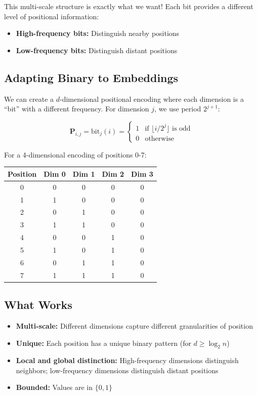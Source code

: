 \documentclass{article}
\begin{document}
This multi-scale structure is exactly what we want! Each bit provides a different level of positional information:
\begin{itemize}
\item \textbf{High-frequency bits:} Distinguish nearby positions
\item \textbf{Low-frequency bits:} Distinguish distant positions
\end{itemize}

\subsection{Adapting Binary to Embeddings}

We can create a $d$-dimensional positional encoding where each dimension is a ``bit'' with a different frequency. For dimension $j$, we use period $2^{j+1}$:

\[
\mathbf{P}_{i,j} = \text{bit}_j(i) = \begin{cases}
1 & \text{if } \lfloor i / 2^j \rfloor \text{ is odd} \\
0 & \text{otherwise}
\end{cases}
\]

For a 4-dimensional encoding of positions 0-7:

\begin{center}
\begin{tabular}{c|cccc}
Position & Dim 0 & Dim 1 & Dim 2 & Dim 3 \\
\hline
0 & 0 & 0 & 0 & 0 \\
1 & 1 & 0 & 0 & 0 \\
2 & 0 & 1 & 0 & 0 \\
3 & 1 & 1 & 0 & 0 \\
4 & 0 & 0 & 1 & 0 \\
5 & 1 & 0 & 1 & 0 \\
6 & 0 & 1 & 1 & 0 \\
7 & 1 & 1 & 1 & 0 \\
\end{tabular}
\end{center}

\subsection{What Works}

\begin{itemize}
\item \textbf{Multi-scale:} Different dimensions capture different granularities of position
\item \textbf{Unique:} Each position has a unique binary pattern (for $d \geq \log_2 n$)
\item \textbf{Local and global distinction:} High-frequency dimensions distinguish neighbors; low-frequency dimensions distinguish distant positions
\item \textbf{Bounded:} Values are in $\{0, 1\}$
\end{itemize}
\end{document}
